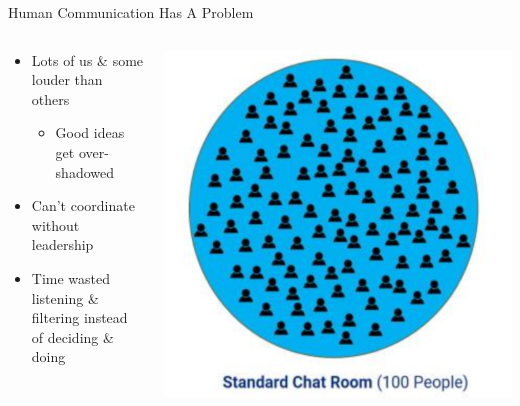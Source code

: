 \documentclass[aspectratio=169]{beamer}
\begin{document}
\begin{frame}{Human Communication Has A Problem}
\begin{columns}[T]
    \begin{column}[T]{0.5\textwidth}
        \begin{itemize}
            \item Lots of us \& some louder than others
            \begin{itemize}
                \item Good ideas get over-shadowed
            \end{itemize}
            \item Can't coordinate without leadership
            \item Time wasted listening \& filtering instead of deciding \& doing
        \end{itemize}
    \end{column}
    \begin{column}{0.5\textwidth}
        \includegraphics[height=0.8\textheight]{imgs/CSI_section/standard_chat_room.png}
    \end{column}
\end{columns}
\end{frame}
\end{document}
